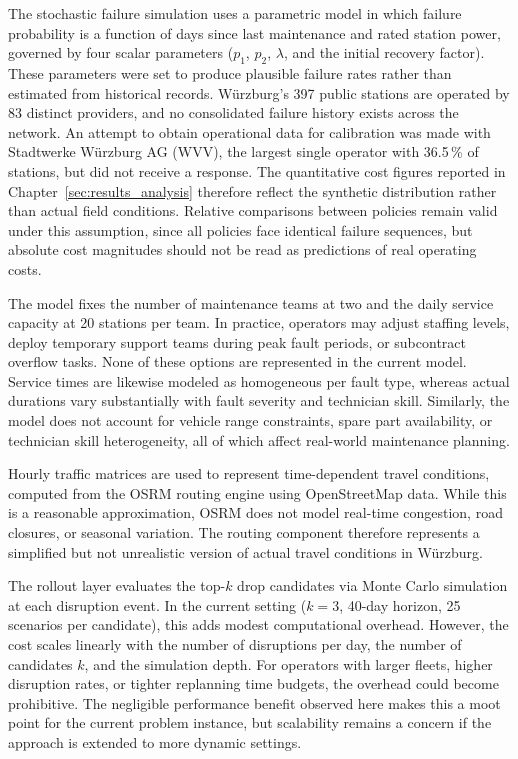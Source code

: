 \documentclass[12pt,oneside]{article}
\begin{document}
The stochastic failure simulation uses a parametric model in which failure probability is a function of days since last maintenance and rated station power, governed by four scalar parameters ($p_1$, $p_2$, $\lambda$, and the initial recovery factor). These parameters were set to produce plausible failure rates rather than estimated from historical records. Würzburg's 397 public stations are operated by 83 distinct providers, and no consolidated failure history exists across the network. An attempt to obtain operational data for calibration was made with Stadtwerke Würzburg AG (WVV), the largest single operator with 36.5\,\% of stations, but did not receive a response. The quantitative cost figures reported in Chapter~\ref{sec:results_analysis} therefore reflect the synthetic distribution rather than actual field conditions. Relative comparisons between policies remain valid under this assumption, since all policies face identical failure sequences, but absolute cost magnitudes should not be read as predictions of real operating costs.

The model fixes the number of maintenance teams at two and the daily service capacity at 20 stations per team. In practice, operators may adjust staffing levels, deploy temporary support teams during peak fault periods, or subcontract overflow tasks. None of these options are represented in the current model. Service times are likewise modeled as homogeneous per fault type, whereas actual durations vary substantially with fault severity and technician skill. Similarly, the model does not account for vehicle range constraints, spare part availability, or technician skill heterogeneity, all of which affect real-world maintenance planning.

Hourly traffic matrices are used to represent time-dependent travel conditions, computed from the OSRM routing engine using OpenStreetMap data. While this is a reasonable approximation, OSRM does not model real-time congestion, road closures, or seasonal variation. The routing component therefore represents a simplified but not unrealistic version of actual travel conditions in Würzburg.

The rollout layer evaluates the top-$k$ drop candidates via Monte Carlo simulation at each disruption event. In the current setting ($k = 3$, 40-day horizon, 25 scenarios per candidate), this adds modest computational overhead. However, the cost scales linearly with the number of disruptions per day, the number of candidates $k$, and the simulation depth. For operators with larger fleets, higher disruption rates, or tighter replanning time budgets, the overhead could become prohibitive. The negligible performance benefit observed here makes this a moot point for the current problem instance, but scalability remains a concern if the approach is extended to more dynamic settings.
\end{document}
